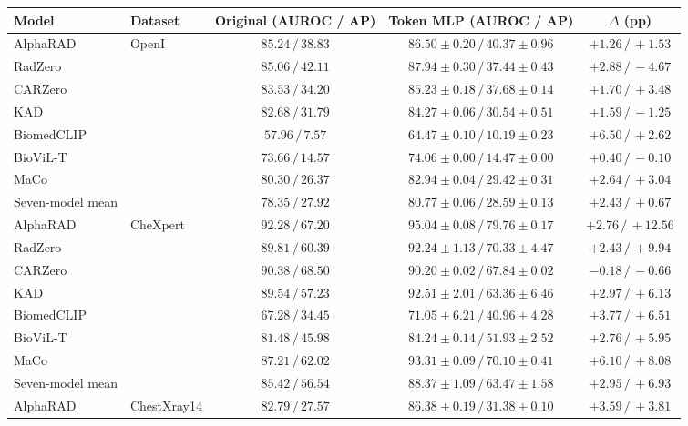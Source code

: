 \begin{table}[t]
\centering
\footnotesize
\setlength{\tabcolsep}{5pt}
\begin{tabular}{@{}llccc@{}}
\toprule
Model & Dataset & Original (AUROC / AP) & Token MLP (AUROC / AP) & $\Delta$ (pp) \\
\midrule
AlphaRAD & \multirow{8}{*}{OpenI} & $85.24\,/\,38.83$ & $86.50\pm0.20\,/\,40.37\pm0.96$ & $+1.26\,/\,+1.53$ \\
RadZero &  & $85.06\,/\,42.11$ & $87.94\pm0.30\,/\,37.44\pm0.43$ & $+2.88\,/\,-4.67$ \\
CARZero &  & $83.53\,/\,34.20$ & $85.23\pm0.18\,/\,37.68\pm0.14$ & $+1.70\,/\,+3.48$ \\
KAD &  & $82.68\,/\,31.79$ & $84.27\pm0.06\,/\,30.54\pm0.51$ & $+1.59\,/\,-1.25$ \\
BiomedCLIP &  & $57.96\,/\,7.57$ & $64.47\pm0.10\,/\,10.19\pm0.23$ & $+6.50\,/\,+2.62$ \\
BioViL-T &  & $73.66\,/\,14.57$ & $74.06\pm0.00\,/\,14.47\pm0.00$ & $+0.40\,/\,-0.10$ \\
MaCo &  & $80.30\,/\,26.37$ & $82.94\pm0.04\,/\,29.42\pm0.31$ & $+2.64\,/\,+3.04$ \\
Seven-model mean &  & $78.35\,/\,27.92$ & $80.77\pm0.06\,/\,28.59\pm0.13$ & $+2.43\,/\,+0.67$ \\
\midrule
AlphaRAD & \multirow{8}{*}{CheXpert} & $92.28\,/\,67.20$ & $95.04\pm0.08\,/\,79.76\pm0.17$ & $+2.76\,/\,+12.56$ \\
RadZero &  & $89.81\,/\,60.39$ & $92.24\pm1.13\,/\,70.33\pm4.47$ & $+2.43\,/\,+9.94$ \\
CARZero &  & $90.38\,/\,68.50$ & $90.20\pm0.02\,/\,67.84\pm0.02$ & $-0.18\,/\,-0.66$ \\
KAD &  & $89.54\,/\,57.23$ & $92.51\pm2.01\,/\,63.36\pm6.46$ & $+2.97\,/\,+6.13$ \\
BiomedCLIP &  & $67.28\,/\,34.45$ & $71.05\pm6.21\,/\,40.96\pm4.28$ & $+3.77\,/\,+6.51$ \\
BioViL-T &  & $81.48\,/\,45.98$ & $84.24\pm0.14\,/\,51.93\pm2.52$ & $+2.76\,/\,+5.95$ \\
MaCo &  & $87.21\,/\,62.02$ & $93.31\pm0.09\,/\,70.10\pm0.41$ & $+6.10\,/\,+8.08$ \\
Seven-model mean &  & $85.42\,/\,56.54$ & $88.37\pm1.09\,/\,63.47\pm1.58$ & $+2.95\,/\,+6.93$ \\
\midrule
AlphaRAD & \multirow{8}{*}{ChestXray14} & $82.79\,/\,27.57$ & $86.38\pm0.19\,/\,31.38\pm0.10$ & $+3.59\,/\,+3.81$ \\

\end{tabular}
\end{table}
